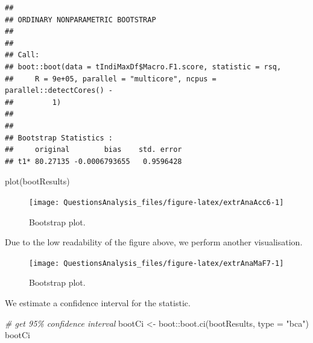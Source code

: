 \documentclass[
]{article}
\newenvironment{Shaded}{\begin{snugshade}}{\end{snugshade}}
\newcommand{\AttributeTok}[1]{\textcolor[rgb]{0.77,0.63,0.00}{#1}}
\newcommand{\CommentTok}[1]{\textcolor[rgb]{0.56,0.35,0.01}{\textit{#1}}}
\newcommand{\FunctionTok}[1]{\textcolor[rgb]{0.00,0.00,0.00}{#1}}
\newcommand{\NormalTok}[1]{#1}
\newcommand{\OtherTok}[1]{\textcolor[rgb]{0.56,0.35,0.01}{#1}}
\newcommand{\SpecialCharTok}[1]{\textcolor[rgb]{0.00,0.00,0.00}{#1}}
\newcommand{\StringTok}[1]{\textcolor[rgb]{0.31,0.60,0.02}{#1}}
\begin{document}
\begin{verbatim}
## 
## ORDINARY NONPARAMETRIC BOOTSTRAP
## 
## 
## Call:
## boot::boot(data = tIndiMaxDf$Macro.F1.score, statistic = rsq, 
##     R = 9e+05, parallel = "multicore", ncpus = parallel::detectCores() - 
##         1)
## 
## 
## Bootstrap Statistics :
##     original        bias    std. error
## t1* 80.27135 -0.0006793655   0.9596428
\end{verbatim}

\begin{Shaded}
\begin{Highlighting}[]
\FunctionTok{plot}\NormalTok{(bootResults)}
\end{Highlighting}
\end{Shaded}

\begin{figure}

{\centering \texttt{[image: QuestionsAnalysis\_files/figure-latex/extrAnaAcc6-1]} 

}

\caption{Bootstrap plot.}\label{fig:extrAnaAcc6}
\end{figure}

Due to the low readability of the figure above, we perform another visualisation.

\begin{Shaded}
\end{Shaded}

\begin{figure}

{\centering \texttt{[image: QuestionsAnalysis\_files/figure-latex/extrAnaMaF7-1]} 

}

\caption{Bootstrap plot.}\label{fig:extrAnaMaF7}
\end{figure}

We estimate a confidence interval for the statistic.

\begin{Shaded}
\begin{Highlighting}[]
\CommentTok{\# get 95\% confidence interval}
\NormalTok{bootCi }\OtherTok{\textless{}{-}}\NormalTok{ boot}\SpecialCharTok{::}\FunctionTok{boot.ci}\NormalTok{(bootResults, }\AttributeTok{type =} \StringTok{"bca"}\NormalTok{)}
\NormalTok{bootCi}
\end{Highlighting}
\end{Shaded}
\end{document}
